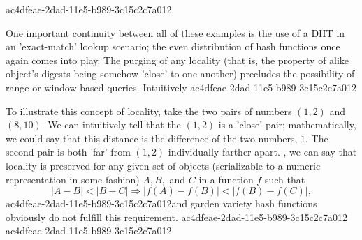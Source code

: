 \documentclass[12pt]{article}
\begin{document}
ac4dfeae-2dad-11e5-b989-3c15c2c7a012\par One important continuity between all of these examples is the use of a DHT in an 'exact-match' lookup scenario; the even distribution of hash functions once again comes into play. The purging of any locality (that is, the property of alike object's digests being somehow 'close' to one another) precludes the possibility of range or window-based queries. Intuitively
ac4dfeae-2dad-11e5-b989-3c15c2c7a012
\par To illustrate this concept of locality, take the two pairs of numbers $(1,2)$ and $(8,10)$. We can intuitively tell that the $(1,2)$ is a 'close' pair; mathematically, we could say that this distance is the difference of the two numbers, $1$. The second pair is both 'far' from $(1,2)$ individually farther apart. , we can say that locality is preserved for any given set of objects (serializable to a numeric representation in some fashion) $A,B,$ and $C$ in a function $f$ such that
\begin{equation}
|A-B| < |B-C| \Rightarrow |f(A)-f(B)| < |f(B) - f(C)|,
\end{equation}
ac4dfeae-2dad-11e5-b989-3c15c2c7a012and garden variety hash functions obviously do not fulfill this requirement.
ac4dfeae-2dad-11e5-b989-3c15c2c7a012
ac4dfeae-2dad-11e5-b989-3c15c2c7a012\printbibliography
\end{document}
